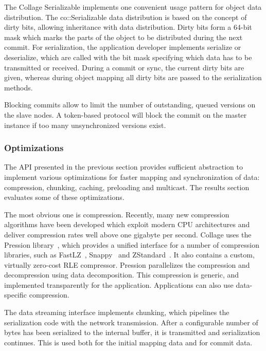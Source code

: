 \label{sec:Serializable}The \textsf{Collage} Serializable implements one
convenient usage pattern for object data distribution. The
\textsf{co::Serializable} data distribution is based on the concept of dirty
bits, allowing inheritance with data distribution. Dirty bits form a 64-bit mask
which marks the parts of the object to be distributed during the next commit.
For serialization, the application developer implements \textsf{serialize} or
\textsf{deserialize}, which are called with the bit mask specifying which data
has to be transmitted or received. During a commit or sync, the current dirty
bits are given, whereas during object mapping all dirty bits are passed to the
serialization methods.

Blocking commits allow to limit the number of outstanding, queued versions on
the slave nodes. A token-based protocol will block the commit on the master
instance if too many unsynchronized versions exist.

\subsubsection{Optimizations}

The API presented in the previous section provides sufficient abstraction to
implement various optimizations for faster mapping and synchronization of data:
compression, chunking, caching, preloading and multicast. The results section
evaluates some of these optimizations.

The most obvious one is compression. Recently, many new compression algorithms
have been developed which exploit modern CPU architectures and deliver
compression rates well above one gigabyte per second. \textsf{Collage} uses the
Pression library~\cite{pression}, which provides a unified interface for a
number of compression libraries, such as FastLZ~\cite{jesperfast},
Snappy~\cite{snappy} and ZStandard~\cite{zstd}. It also contains a custom,
virtually zero-cost RLE compressor. Pression parallelizes the compression and
decompression using data decomposition. This compression is generic, and
implemented transparently for the application. Applications can also use
data-specific compression.

The data streaming interface implements chunking, which pipelines the
serialization code with the network transmission. After a configurable number of
bytes has been serialized to the internal buffer, it is transmitted and
serialization continues. This is used both for the initial mapping data and for
commit data.

